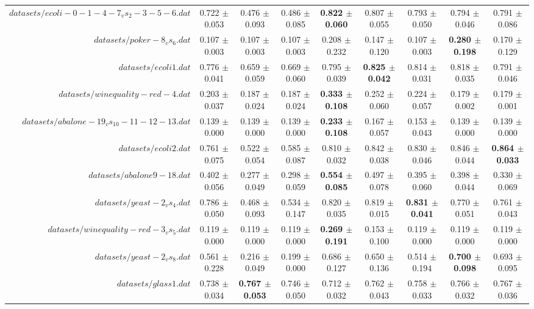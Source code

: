\begin{table}[!ht]
{\begin{tabular}{r c c c c c c c c}
$datasets/ecoli-0-1-4-7_vs_2-3-5-6.dat$ & 0.722 $\pm$ 0.053 & 0.476 $\pm$ 0.093 & 0.486 $\pm$ 0.085 & \textbf{0.822 $\pm$ 0.060} & 0.807 $\pm$ 0.055 & 0.793 $\pm$ 0.050 & 0.794 $\pm$ 0.046 & 0.791 $\pm$ 0.086 \\
$datasets/poker-8_vs_6.dat$ & 0.107 $\pm$ 0.003 & 0.107 $\pm$ 0.003 & 0.107 $\pm$ 0.003 & 0.208 $\pm$ 0.232 & 0.147 $\pm$ 0.120 & 0.107 $\pm$ 0.003 & \textbf{0.280 $\pm$ 0.198} & 0.170 $\pm$ 0.129 \\
$datasets/ecoli1.dat$ & 0.776 $\pm$ 0.041 & 0.659 $\pm$ 0.059 & 0.669 $\pm$ 0.060 & 0.795 $\pm$ 0.039 & \textbf{0.825 $\pm$ 0.042} & 0.814 $\pm$ 0.031 & 0.818 $\pm$ 0.035 & 0.791 $\pm$ 0.046 \\
$datasets/winequality-red-4.dat$ & 0.203 $\pm$ 0.037 & 0.187 $\pm$ 0.024 & 0.187 $\pm$ 0.024 & \textbf{0.333 $\pm$ 0.108} & 0.252 $\pm$ 0.060 & 0.224 $\pm$ 0.057 & 0.179 $\pm$ 0.002 & 0.179 $\pm$ 0.001 \\
$datasets/abalone-19_vs_10-11-12-13.dat$ & 0.139 $\pm$ 0.000 & 0.139 $\pm$ 0.000 & 0.139 $\pm$ 0.000 & \textbf{0.233 $\pm$ 0.108} & 0.167 $\pm$ 0.057 & 0.153 $\pm$ 0.043 & 0.139 $\pm$ 0.000 & 0.139 $\pm$ 0.000 \\
$datasets/ecoli2.dat$ & 0.761 $\pm$ 0.075 & 0.522 $\pm$ 0.054 & 0.585 $\pm$ 0.087 & 0.810 $\pm$ 0.032 & 0.842 $\pm$ 0.038 & 0.830 $\pm$ 0.046 & 0.846 $\pm$ 0.044 & \textbf{0.864 $\pm$ 0.033} \\
$datasets/abalone9-18.dat$ & 0.402 $\pm$ 0.056 & 0.277 $\pm$ 0.049 & 0.298 $\pm$ 0.059 & \textbf{0.554 $\pm$ 0.085} & 0.497 $\pm$ 0.078 & 0.395 $\pm$ 0.060 & 0.398 $\pm$ 0.044 & 0.330 $\pm$ 0.069 \\
$datasets/yeast-2_vs_4.dat$ & 0.786 $\pm$ 0.050 & 0.468 $\pm$ 0.093 & 0.534 $\pm$ 0.147 & 0.820 $\pm$ 0.035 & 0.819 $\pm$ 0.015 & \textbf{0.831 $\pm$ 0.041} & 0.770 $\pm$ 0.051 & 0.761 $\pm$ 0.043 \\
$datasets/winequality-red-3_vs_5.dat$ & 0.119 $\pm$ 0.000 & 0.119 $\pm$ 0.000 & 0.119 $\pm$ 0.000 & \textbf{0.269 $\pm$ 0.191} & 0.153 $\pm$ 0.100 & 0.119 $\pm$ 0.000 & 0.119 $\pm$ 0.000 & 0.119 $\pm$ 0.000 \\
$datasets/yeast-2_vs_8.dat$ & 0.561 $\pm$ 0.228 & 0.216 $\pm$ 0.049 & 0.199 $\pm$ 0.000 & 0.686 $\pm$ 0.127 & 0.650 $\pm$ 0.136 & 0.514 $\pm$ 0.194 & \textbf{0.700 $\pm$ 0.098} & 0.693 $\pm$ 0.095 \\
$datasets/glass1.dat$ & 0.738 $\pm$ 0.034 & \textbf{0.767 $\pm$ 0.053} & 0.746 $\pm$ 0.050 & 0.712 $\pm$ 0.032 & 0.762 $\pm$ 0.043 & 0.758 $\pm$ 0.033 & 0.766 $\pm$ 0.032 & 0.767 $\pm$ 0.036 \\

\end{tabular}}
\end{table}
